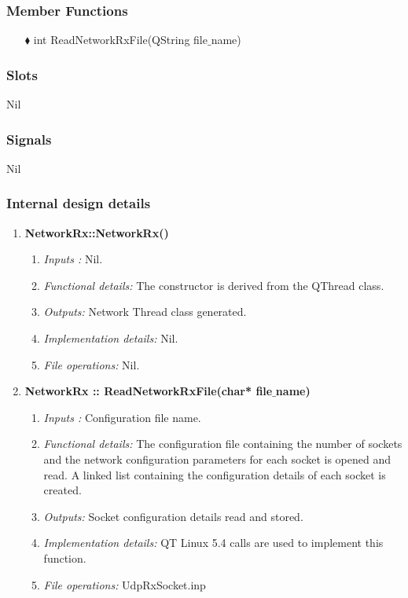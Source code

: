 \begin{enumerate}
\subsubsection{Member Functions }
\begin{enumerate}
	\item [$\blacklozenge$] int ReadNetworkRxFile(QString file$\_$name)
\end{enumerate}


\subsubsection{Slots}
Nil

\subsubsection{Signals}
Nil


\subsubsection{Internal design details }
\begin{enumerate}
	\item  \textbf{NetworkRx::NetworkRx()}
	\begin{enumerate}
		\item \textit{Inputs :} Nil.
		\item \textit{Functional details:} The constructor is derived from the QThread class.
		\item \textit{Outputs:} Network Thread class generated.
		\item \textit{Implementation details:} Nil.
		\item \textit{File operations:} Nil.
	\end{enumerate}
	\item  \textbf{NetworkRx :: ReadNetworkRxFile(char* file$\_$name)}
	\begin{enumerate}
		\item \textit{Inputs :} Configuration file name.
		\item \textit{Functional details:} The configuration file containing the number of sockets and the network configuration parameters for each socket is opened and read. A linked list containing the configuration details of each socket is created.
		\item \textit{Outputs:} Socket configuration details read and stored. 
		\item \textit{Implementation details:} QT Linux 5.4 calls are used to implement this function.
		\item \textit{File operations:} UdpRxSocket.inp
	\end{enumerate}   
\end{enumerate}


\end{enumerate}
